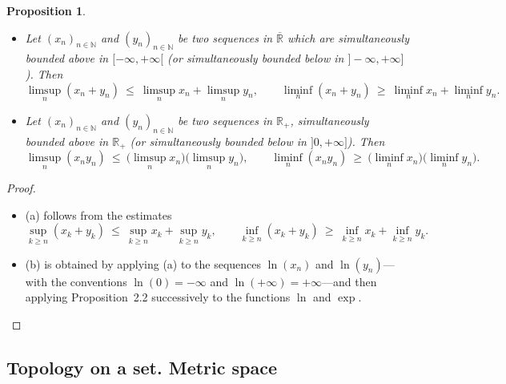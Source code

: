 \documentclass[11pt]{article}
\newtheorem{proposition}{Proposition}[section]
\theoremstyle{definition}
\begin{document}
\begin{proposition}
\begin{itemize}[leftmargin=1.5em]
\item[(a)] Let $(x_n)_{n\in\mathbb{N}}$ and $(y_n)_{n\in\mathbb{N}}$ be two sequences in $\overline{\mathbb{R}}$ which are simultaneously bounded above in $[-\infty,+\infty[$ (or simultaneously bounded below in $]-\infty,+\infty]$).
Then
\[
\limsup_{n}(x_n+y_n)\ \le\ \limsup_{n} x_n + \limsup_{n} y_n,
\qquad
\liminf_{n}(x_n+y_n)\ \ge\ \liminf_{n} x_n + \liminf_{n} y_n .
\]
\item[(b)] Let $(x_n)_{n\in\mathbb{N}}$ and $(y_n)_{n\in\mathbb{N}}$ be two sequences in $\mathbb{R}_+$, simultaneously bounded above in $\mathbb{R}_+$ (or simultaneously bounded below in $]0,+\infty]$).
Then
\[
\limsup_{n}(x_n y_n)\ \le\ \bigl(\limsup_{n} x_n\bigr)\bigl(\limsup_{n} y_n\bigr),
\qquad
\liminf_{n}(x_n y_n)\ \ge\ \bigl(\liminf_{n} x_n\bigr)\bigl(\liminf_{n} y_n\bigr).
\]
\end{itemize}
\end{proposition}

\begin{proof}
\begin{itemize}
\item (a) follows from the estimates
\[
\sup_{k\ge n}(x_k+y_k)\ \le\ \sup_{k\ge n} x_k + \sup_{k\ge n} y_k,
\qquad
\inf_{k\ge n}(x_k+y_k)\ \ge\ \inf_{k\ge n} x_k + \inf_{k\ge n} y_k.
\]

\item (b) is obtained by applying (a) to the sequences $\ln(x_n)$ and $\ln(y_n)$—with the conventions $\ln(0)=-\infty$ and $\ln(+\infty)=+\infty$—and then applying Proposition~2.2 successively to the functions $\ln$ and $\exp$.
\end{itemize}
\end{proof}

\subsection{Topology on a set. Metric space}\label{sec:2.3}
\end{document}
